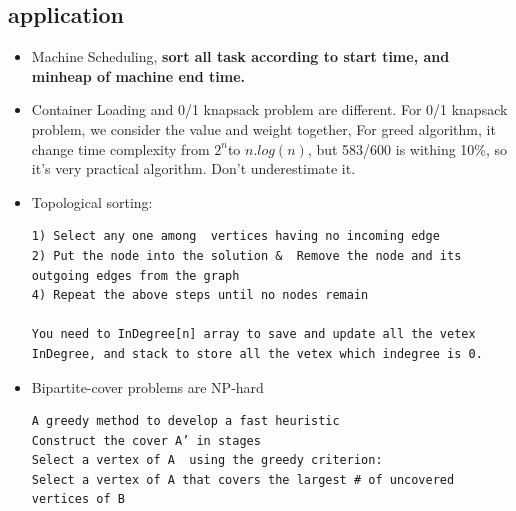 \documentclass[a4paper,12pt,twoside]{book}
\begin{document}
\subsection{application}
\begin{itemize}
\item  Machine Scheduling, \textbf{sort all task according to start time, and minheap of machine end time. }

\item Container Loading and 0/1 knapsack problem are different. For 0/1 knapsack problem, we consider the value and weight together,  For greed algorithm, it change time complexity from $2^{n}$to $n.log(n)$, but 583/600 is withing 10\%, so it's very practical algorithm.  Don't underestimate it. 

\item Topological sorting: 
\begin{verbatim}
1) Select any one among  vertices having no incoming edge
2) Put the node into the solution &  Remove the node and its outgoing edges from the graph
4) Repeat the above steps until no nodes remain

You need to InDegree[n] array to save and update all the vetex InDegree, and stack to store all the vetex which indegree is 0.  
\end{verbatim}


\item Bipartite-cover problems are NP-hard
\begin{verbatim}
A greedy method to develop a fast heuristic
Construct the cover A’ in stages
Select a vertex of A  using the greedy criterion:
Select a vertex of A that covers the largest # of uncovered vertices of B
\end{verbatim}


\end{itemize}
\end{document}
